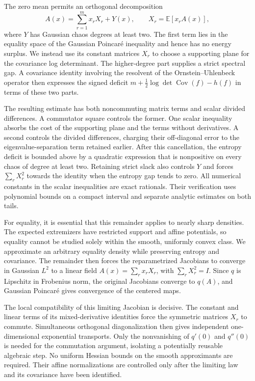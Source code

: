 \documentclass[11pt]{article}
\newcommand{\E}{\mathbb E}
\DeclareMathOperator{\Cov}{Cov}
\theoremstyle{definition}
\theoremstyle{remark}
\numberwithin{equation}{section}
\begin{document}
The zero mean permits an orthogonal decomposition
\[
 A(x)=\sum_{r=1}^m x_rX_r+Y(x),
 \qquad X_r=\E[x_rA(x)],
\]
where $Y$ has Gaussian chaos degrees at least two.  The first term lies
in the equality space of the Gaussian Poincar\'e inequality and hence
has no energy surplus.  We instead use its constant matrices $X_r$ to
choose a supporting plane for the covariance log determinant.
The higher-degree part supplies a strict spectral gap.  A covariance
identity involving the resolvent of the Ornstein--Uhlenbeck operator
then expresses the signed deficit
$m+\tfrac12\log\det\Cov(f)-h(f)$ in terms of these two parts.

The resulting estimate has both noncommuting matrix terms and scalar
divided differences.  A commutator square controls the former.
One scalar inequality absorbs the cost of the supporting plane and
the terms without derivatives.  A second controls the divided
differences, charging their off-diagonal error to the
eigenvalue-separation term retained earlier.
After this cancellation, the entropy deficit is bounded above by a
quadratic expression that is nonpositive on every chaos of degree at
least two. Retaining strict slack also controls $Y$ and forces
$\sum_rX_r^2$ towards the identity when the entropy gap tends to zero.  All numerical constants in the scalar inequalities are
exact rationals.  Their verification uses polynomial bounds on a compact
interval and separate analytic estimates on both tails.

For equality, it is essential that this remainder applies to nearly
sharp densities. The expected extremizers have restricted support and
affine potentials, so equality cannot be studied solely within the
smooth, uniformly convex class. We approximate an arbitrary equality
density while preserving entropy and covariance. The remainder then
forces the reparametrized Jacobians to converge in Gaussian $L^2$ to
a linear field $A(x)=\sum_rx_rX_r$, with $\sum_rX_r^2=I$.
Since $q$ is Lipschitz in Frobenius norm, the original Jacobians
converge to $q(A)$, and Gaussian Poincar\'e gives convergence of the
centered maps.

The local compatibility of this limiting Jacobian is decisive.
The constant and linear terms of its mixed-derivative identities
force the symmetric matrices $X_r$ to commute. Simultaneous
orthogonal diagonalization then gives independent one-dimensional
exponential transports. Only the nonvanishing of $q'(0)$ and $q''(0)$
is needed for the commutation argument, isolating a potentially
reusable algebraic step. No uniform Hessian bounds on the smooth
approximants are required. Their affine normalizations are controlled
only after the limiting law and its covariance have been identified.
\end{document}
